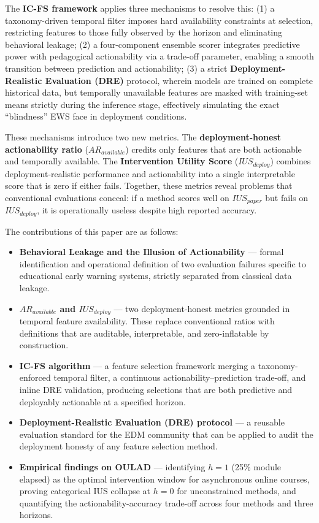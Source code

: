 \documentclass[a4paper,fleqn]{cas-sc}
\begin{document}
The \textbf{IC-FS framework} applies three mechanisms to resolve this: (1) a taxonomy-driven temporal filter imposes hard availability constraints at selection, restricting features to those fully observed by the horizon and eliminating behavioral leakage; (2) a four-component ensemble scorer integrates predictive power with pedagogical actionability via a trade-off parameter, enabling a smooth transition between prediction and actionability; (3) a strict \textbf{Deployment-Realistic Evaluation (DRE)} protocol, wherein models are trained on complete historical data, but temporally unavailable features are masked with training-set means strictly during the inference stage, effectively simulating the exact ``blindness'' EWS face in deployment conditions.

These mechanisms introduce two new metrics. The \textbf{deployment-honest actionability ratio} ($AR_{available}$) credits only features that are both actionable and temporally available. The \textbf{Intervention Utility Score} ($IUS_{deploy}$) combines deployment-realistic performance and actionability into a single interpretable score that is zero if either fails. Together, these metrics reveal problems that conventional evaluations conceal: if a method scores well on $IUS_{paper}$ but fails on $IUS_{deploy}$, it is operationally useless despite high reported accuracy.

The contributions of this paper are as follows:
\begin{itemize}
    \item \textbf{Behavioral Leakage and the Illusion of Actionability} --- formal identification and operational definition of two evaluation failures specific to educational early warning systems, strictly separated from classical data leakage.
    \item \textbf{$AR_{available}$ and $IUS_{deploy}$} --- two deployment-honest metrics grounded in temporal feature availability. These replace conventional ratios with definitions that are auditable, interpretable, and zero-inflatable by construction.
    \item \textbf{IC-FS algorithm} --- a feature selection framework merging a taxonomy-enforced temporal filter, a continuous actionability--prediction trade-off, and inline DRE validation, producing selections that are both predictive and deployably actionable at a specified horizon.
    \item \textbf{Deployment-Realistic Evaluation (DRE) protocol} --- a reusable evaluation standard for the EDM community that can be applied to audit the deployment honesty of any feature selection method.
    \item \textbf{Empirical findings on OULAD} --- identifying $h=1$ (25\% module elapsed) as the optimal intervention window for asynchronous online courses, proving categorical IUS collapse at $h=0$ for unconstrained methods, and quantifying the actionability-accuracy trade-off across four methods and three horizons.
\end{itemize}
\end{document}

